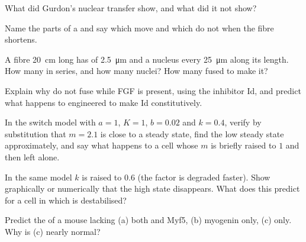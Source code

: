 \begin{exercise}[$\star$]\label{exo:b2:cell-differentiation:3}
What did Gurdon's nuclear transfer show, and what did it not show?
\end{exercise}

\begin{exercise}[$\star$]\label{exo:b2:cell-differentiation:4}
Name the parts of a  and say which move and which do not
when the fibre shortens.
\end{exercise}

\begin{exercise}[$\star\star$]\label{exo:b2:cell-differentiation:5}
A fibre \qty{20}{cm} long has  of \qty{2.5}{\micro m} and a
nucleus every \qty{25}{\micro m} along its length. How many
 in series, and how many nuclei? How many  fused
to make it?
\end{exercise}

\begin{exercise}[$\star\star$]\label{exo:b2:cell-differentiation:6}
Explain why  do not fuse while FGF is present, using the
inhibitor Id, and predict what happens to  engineered to
make Id constitutively.
\end{exercise}

\begin{exercise}[$\star\star$]\label{exo:b2:cell-differentiation:7}
In the switch model with $a = 1$, $K = 1$, $b = 0.02$ and $k = 0.4$,
verify by substitution that $m = 2.1$ is close to a steady state,
find the low steady state approximately, and say what happens to a
cell whose $m$ is briefly raised to $1$ and then left alone.
\end{exercise}

\begin{exercise}[$\star\star$]\label{exo:b2:cell-differentiation:8}
In the same model $k$ is raised to $0.6$ (the factor is degraded
faster). Show graphically or numerically that the high state
disappears. What does this predict for a cell in which  is
destabilised?
\end{exercise}

\begin{exercise}[$\star\star$]\label{exo:b2:cell-differentiation:9}
Predict the  of a mouse lacking (a) both  and Myf5,
(b) myogenin only, (c)  only. Why is (c) nearly normal?
\end{exercise}


